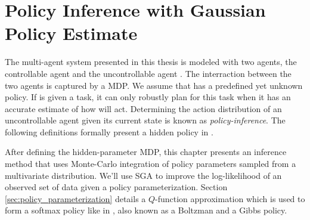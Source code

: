 %
%
\chapter{Policy Inference with Gaussian Policy Estimate}\label{chapt:gauss_policy}

    The multi-agent system presented in this thesis is modeled with two agents, the controllable agent  and the
    uncontrollable agent . The interraction between the two agents is captured by a \acf{MDP}. We assume that
     has a predefined yet unknown policy. If  is given a task, it can only robustly plan for this task
    when it has an accurate estimate of how  will act. Determining the action distribution of an uncontrollable
    agent given its current state is known as \textit{policy-inference}. The following definitions formally present a
    hidden policy in .

    After defining the hidden-parameter MDP, this chapter presents an inference method that uses Monte-Carlo integration
    of policy parameters sampled from a multivariate distribution. We'll use \ac{SGA} to improve the log-likelihood of
    an observed set of data given a policy parameterization. Section \ref{sec:policy_parameterization} details a
    $Q$-function approximation which is used to form a softmax policy like in \cite{nachum2017bridging}, also known as a
    Boltzman \cite{Hanawal2017LearningPolicies} and a Gibbs \cite{Sugiyama2015StatisticalRL} policy.

